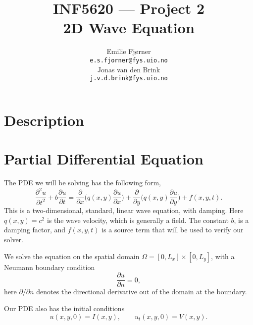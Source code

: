 \documentclass[a4paper, 11pt, notitlepage, english]{article}
\author{Emilie Fjørner \\[-0.4cm] \texttt{e.s.fjorner@fys.uio.no} \\[0.2cm] Jonas van den Brink \\[-0.4cm] \texttt{j.v.d.brink@fys.uio.no}}
\title{INF5620 --- Project 2 \\ 2D Wave Equation}
\newcommand{\p}{\partial}
\begin{document}
\maketitle

\vspace{1cm}

\section*{Description}

\clearpage

\section*{Partial Differential Equation}

The PDE we will be solving has the following form,
$$\frac{\p^2 u}{\p t^2} + b\frac{\p u}{\p t} = \frac{\p}{\p x}\bigg(q(x,y) \frac{\p u}{\p x}\bigg) + \frac{\p}{\p y}\bigg(q(x,y)\frac{\p u}{\p y} \bigg) + f(x,y,t).$$
This is a two-dimensional, standard, linear wave equation, with damping. Here $q(x,y) = c^2$ is the wave velocity, which is generally a field. The constant $b$, is a damping factor, and $f(x,y,t)$ is a source term that will be used to verify our solver.

We solve the equation on the spatial domain $\Omega = [0,L_x] \times [0,L_y]$, with a Neumann boundary condition
$$\frac{\p u}{\p n} = 0,$$
here $\p/\p n$ denotes the directional derivative out of the domain at the boundary.

Our PDE also has the initial conditions
$$u(x,y,0) = I(x,y), \qquad u_t(x,y,0) = V(x,y).$$
\end{document}
